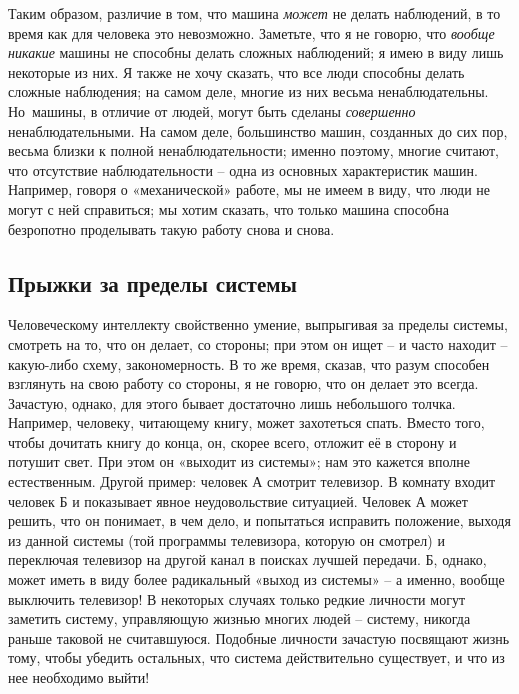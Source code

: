 \documentclass[../main.tex]{subfiles}
\begin{document}
Таким образом, различие в том, что машина \emph{может} не делать наблюдений, в то время как для человека это невозможно. Заметьте, что я не говорю, что \emph{вообще никакие} машины не способны делать сложных наблюдений; я имею в виду лишь некоторые из них. Я также не хочу сказать, что все люди способны делать сложные наблюдения; на самом деле, многие из них весьма ненаблюдательны. Но~машины, в отличие от людей, могут быть сделаны \emph{совершенно} ненаблюдательными. На самом деле, большинство машин, созданных до сих пор, весьма близки к полной ненаблюдательности; именно поэтому, многие считают, что отсутствие наблюдательности \--- одна из основных характеристик машин. Например, говоря о «механической» работе, мы не имеем в виду, что люди не могут с ней справиться; мы хотим сказать, что только машина способна безропотно проделывать такую работу снова и снова.


\subsection{Прыжки за пределы системы}

Человеческому интеллекту свойственно умение, выпрыгивая за пределы системы, смотреть на то, что он делает, со стороны; при этом он ищет \--- и часто находит \--- какую-либо схему, закономерность. В то же время, сказав, что разум способен взглянуть на свою работу со стороны, я не говорю, что он делает это всегда. Зачастую, однако, для этого бывает достаточно лишь небольшого толчка. Например, человеку, читающему книгу, может захотеться спать. Вместо того, чтобы дочитать книгу до конца, он, скорее всего, отложит её в сторону и потушит свет. При этом он «выходит из системы»; нам это кажется вполне естественным. Другой пример: человек А смотрит телевизор. В комнату входит человек Б и показывает явное неудовольствие ситуацией. Человек А может решить, что он понимает, в чем дело, и попытаться исправить положение, выходя из данной системы (той программы телевизора, которую он смотрел) и переключая телевизор на другой канал в поисках лучшей передачи. Б, однако, может иметь в виду более радикальный «выход из системы» \--- а именно, вообще выключить телевизор! В некоторых случаях только редкие личности могут заметить систему, управляющую жизнью многих людей \--- систему, никогда раньше таковой не считавшуюся. Подобные личности зачастую посвящают жизнь тому, чтобы убедить остальных, что система действительно существует, и что из нее необходимо выйти!
\end{document}
